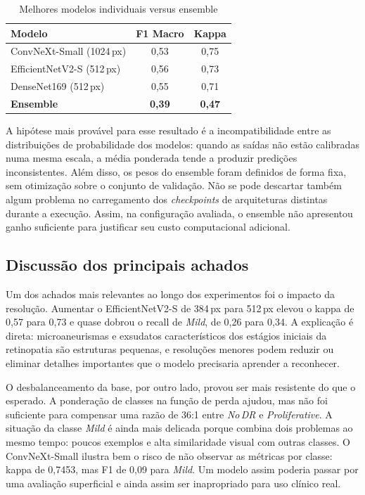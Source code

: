 \documentclass[conference]{IEEEtran}
\begin{document}
\begin{table}[htbp]
\caption{Melhores modelos individuais versus ensemble}
\label{tab:ensemble}
\centering
\scriptsize
\begin{tabular}{l c c}
\hline
\textbf{Modelo} & \textbf{F1 Macro} & \textbf{Kappa} \\
\hline
ConvNeXt-Small (1024\,px)  & 0,53 & 0,75 \\
EfficientNetV2-S (512\,px) & 0,56 & 0,73 \\
DenseNet169 (512\,px)      & 0,55 & 0,71 \\
\textbf{Ensemble}          & \textbf{0,39} & \textbf{0,47} \\
\hline
\end{tabular}
\end{table}

A hip\'otese mais prov\'avel para esse resultado \'e a incompatibilidade
entre as distribui\c{c}\~oes de probabilidade dos modelos: quando as
sa\'idas n\~ao est\~ao calibradas numa mesma escala, a m\'edia ponderada
tende a produzir predi\c{c}\~oes inconsistentes. Al\'em disso, os pesos
do ensemble foram definidos de forma fixa, sem otimiza\c{c}\~ao sobre o
conjunto de valida\c{c}\~ao. N\~ao se pode descartar tamb\'em algum
problema no carregamento dos \textit{checkpoints} de arquiteturas
distintas durante a execu\c{c}\~ao. Assim, na configura\c{c}\~ao
avaliada, o ensemble n\~ao apresentou ganho suficiente para justificar
seu custo computacional adicional.

\subsection{Discuss\~ao dos principais achados}

Um dos achados mais relevantes ao longo dos experimentos foi o impacto
da resolu\c{c}\~ao. Aumentar o EfficientNetV2-S de 384\,px para 512\,px
elevou o kappa de 0,57 para 0,73 e quase dobrou o recall de
\textit{Mild}, de 0,26 para 0,34. A explica\c{c}\~ao \'e direta:
microaneurismas e exsudatos caracter\'isticos dos est\'agios iniciais da
retinopatia s\~ao estruturas pequenas, e resolu\c{c}\~oes menores podem
reduzir ou eliminar detalhes importantes que o modelo precisaria aprender
a reconhecer.

O desbalanceamento da base, por outro lado, provou ser mais resistente
do que o esperado. A pondera\c{c}\~ao de classes na fun\c{c}\~ao de
perda ajudou, mas n\~ao foi suficiente para compensar uma raz\~ao de
36:1 entre \textit{No\,DR} e \textit{Proliferative}. A situa\c{c}\~ao
da classe \textit{Mild} \'e ainda mais delicada porque combina dois
problemas ao mesmo tempo: poucos exemplos e alta similaridade visual
com outras classes. O ConvNeXt-Small ilustra bem o risco de n\~ao
observar as m\'etricas por classe: kappa de 0,7453, mas F1 de 0,09
para \textit{Mild}. Um modelo assim poderia passar por uma
avalia\c{c}\~ao superficial e ainda assim ser inapropriado para uso
cl\'inico real.
\end{document}
